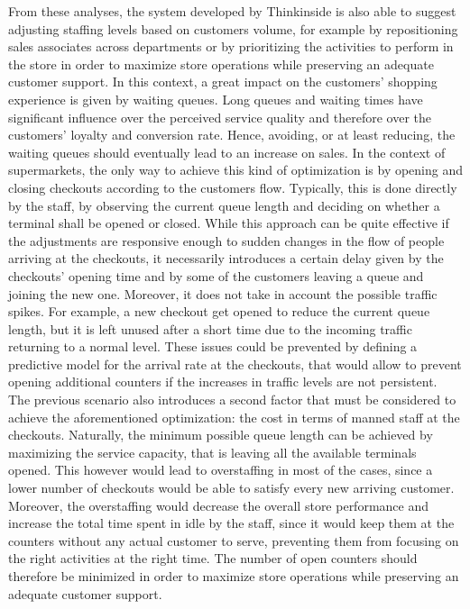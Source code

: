 From these analyses, the system developed by Thinkinside is also able to suggest adjusting staffing levels based on customers volume, for example by repositioning sales associates across departments or by prioritizing the activities to perform in the store in order to maximize store operations while preserving an adequate customer support. In this context, a great impact on the customers’ shopping experience is given by waiting queues. Long queues and waiting times have significant influence over the perceived service quality and therefore over the customers’ loyalty and conversion rate. Hence, avoiding, or at least reducing, the waiting queues should eventually lead to an increase on sales. In the context of supermarkets, the only way to achieve this kind of optimization is by opening and closing checkouts according to the customers flow. Typically, this is done directly by the staff, by observing the current queue length and deciding on whether a terminal shall be opened or closed. While this approach can be quite effective if the adjustments are responsive enough to sudden changes in the flow of people arriving at the checkouts, it necessarily introduces a certain delay given by the checkouts’ opening time and by some of the customers leaving a queue and joining the new one. Moreover, it does not take in account the possible traffic spikes. For example, a new checkout get opened to reduce the current queue length, but it is left unused after a short time due to the incoming traffic returning to a normal level. These issues could be prevented by defining a predictive model for the arrival rate at the checkouts, that would allow to prevent opening additional counters if the increases in traffic levels are not persistent. The previous scenario also introduces a second factor that must be considered to achieve the aforementioned optimization: the cost in terms of manned staff at the checkouts. Naturally, the minimum possible queue length can be achieved by maximizing the service capacity, that is leaving all the available terminals opened. This however would lead to overstaffing in most of the cases, since a lower number of checkouts would be able to satisfy every new arriving customer. Moreover, the overstaffing would decrease the overall store performance and increase the total time spent in idle by the staff, since it would keep them at the counters without any actual customer to serve, preventing them from focusing on the right activities at the right time. The number of open counters should therefore be minimized in order to maximize store operations while preserving an adequate customer support.

